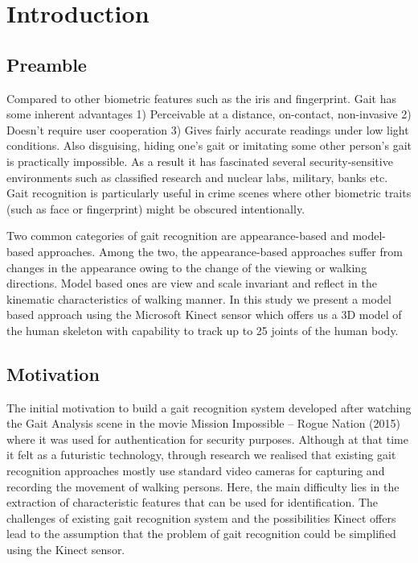 \chapter{Introduction} \label{Introduction}

\section{Preamble} \label{Preamble}
\noindent Compared to other biometric features such as the iris and fingerprint. Gait has some inherent advantages
1) Perceivable at a distance, on-contact, non-invasive
2) Doesn’t require user cooperation
3) Gives fairly accurate readings under low light conditions.
Also disguising, hiding one’s gait or imitating some other person’s gait is practically impossible. As a result it has fascinated several security-sensitive environments such as classified research and nuclear labs, military, banks etc. Gait recognition is particularly useful in crime scenes where other biometric traits (such as face or fingerprint) might be obscured intentionally. \par

\noindent Two common categories of gait recognition are appearance-based and model-based approaches. Among the two, the appearance-based approaches suffer from changes in the appearance owing to the change of the viewing or walking directions. Model based ones are view and scale invariant and reflect in the kinematic characteristics of walking manner. In this study we present a model based approach using the Microsoft Kinect sensor which offers us a 3D model of the human skeleton with capability to track up to 25 joints of the human body. 
\section{Motivation}\label{Motivation}
\noindent The initial motivation to build a gait recognition system developed after watching the Gait Analysis scene in the movie Mission Impossible – Rogue Nation (2015) where it was used for authentication for security purposes. Although at that time it felt as a futuristic technology, through research we realised that existing gait recognition approaches mostly use standard video cameras for capturing and recording the movement of walking persons. Here, the main difficulty lies in the extraction of characteristic features that can be used for identification. The challenges of existing gait recognition system and the possibilities Kinect offers lead to the assumption that the problem of gait recognition could be simplified using the Kinect sensor.
\newpage

